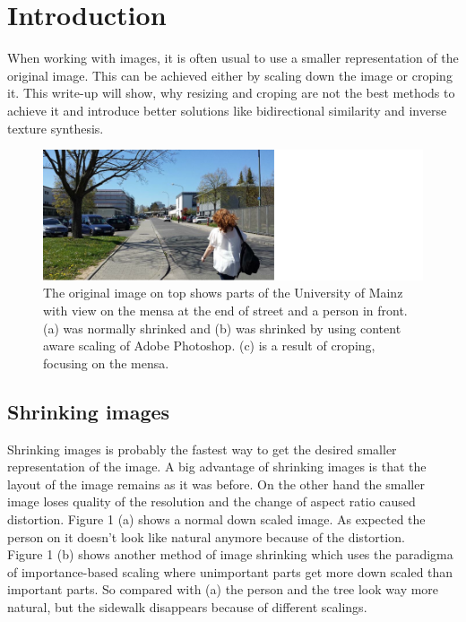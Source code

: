 \section{Introduction}
When working with images, it is often usual to use a smaller representation of the original image.
This can be achieved either by scaling down the image or croping it. This write-up will show, why resizing and croping are not the best methods to achieve it and introduce better solutions like bidirectional similarity\cite{bisi} and inverse texture synthesis\cite{its}. 

\begin{figure}[h]
\centering
\includegraphics[scale=0.9]{img/ShrinkingCropping}
\caption[blah]{The original image on top shows parts of the University of Mainz with view on
the mensa at the end of street and a person in front. (a) was normally shrinked and (b) was shrinked by using content aware scaling of Adobe Photoshop\footnotemark. (c) is a result of croping, focusing on the mensa.}
\label{Image shrinking}
\end{figure}


\subsection{Shrinking images}
Shrinking images is probably the fastest way to get the desired smaller representation of the image. A big advantage of shrinking images is that the layout of the image remains as it was before. On the other hand the smaller image loses quality of the resolution and the change of aspect ratio caused distortion. Figure 1 (a) shows a normal down scaled image. As expected the person on it doesn't look like natural anymore because of the distortion.\\
Figure 1 (b) shows another method of image shrinking which uses the paradigma of importance-based scaling where unimportant parts get more down scaled than important parts. So compared with (a) the person and the tree look way more natural, but the sidewalk disappears because of different scalings.



